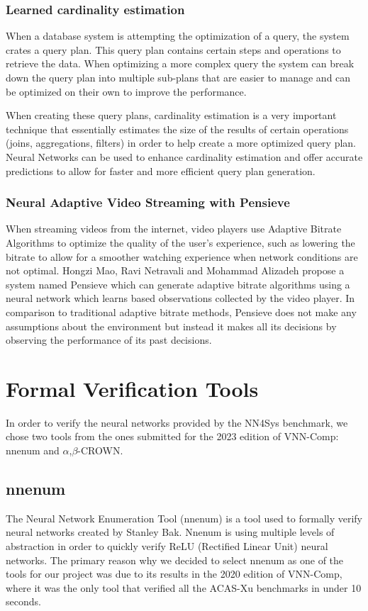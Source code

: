 \documentclass[12pt]{report}
\begin{document}
\subsubsection{Learned cardinality estimation}
When a database system is attempting the optimization of a query, the system crates a query plan.
This query plan contains certain steps and operations to retrieve the data.
When optimizing a more complex query the system can break down the query plan into multiple sub-plans that are easier to manage and can be optimized on their own to improve the performance.

When creating these query plans, cardinality estimation is a very important technique that essentially estimates the size of the results of certain operations (joins, aggregations, filters) in order to help create a more optimized query plan.
Neural Networks can be used to enhance cardinality estimation and offer accurate predictions to allow for faster and more efficient query plan generation. \autocite{nn4sysbench2022}

\subsubsection{Neural Adaptive Video Streaming with Pensieve}
When streaming videos from the internet, video players use Adaptive Bitrate Algorithms to optimize the quality of the user's experience, such as lowering the bitrate to allow for a smoother watching experience when network conditions are not optimal.
Hongzi Mao, Ravi Netravali and Mohammad Alizadeh propose a system named Pensieve which can generate adaptive bitrate algorithms using a neural network which learns based observations collected by the video player.
In comparison to traditional adaptive bitrate methods, Pensieve does not make any assumptions about the environment but instead it makes all its decisions by observing the performance of its past decisions. \autocite{Pensieve2017}

\section{Formal Verification Tools}
In order to verify the neural networks provided by the NN4Sys benchmark, we chose two tools from the ones submitted for the 2023 edition of VNN-Comp: nnenum and $\alpha$,$\beta$-CROWN.

\subsection{nnenum}
The Neural Network Enumeration Tool (nnenum) is a tool used to formally verify neural networks created by Stanley Bak.
Nnenum is using multiple levels of abstraction in order to quickly verify ReLU (Rectified Linear Unit) neural networks. \autocite{bak2021nfm}
The primary reason why we decided to select nnenum as one of the tools for our project was due to its results in the 2020 edition of VNN-Comp, where it was the only tool that verified all the ACAS-Xu benchmarks in under 10 seconds.
\end{document}
